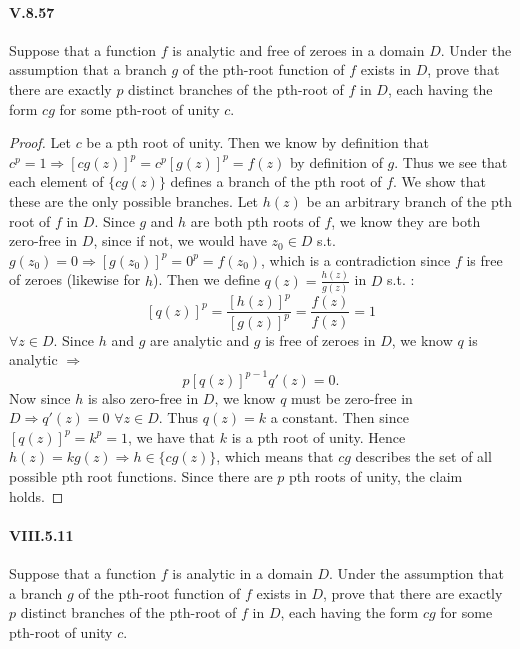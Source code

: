 \documentclass[10pt]{article}
\begin{document}
\paragraph{V.8.57} Suppose that a function $f$ is analytic and free of zeroes in a domain $D$. Under the assumption that a branch $g$ of the pth-root function of $f$ exists in $D$, prove that there are exactly $p$ distinct branches of the pth-root of $f$ in $D$, each having the form $cg$ for some pth-root of unity $c$.  
\begin{proof}
Let $c$ be a pth root of unity. Then we know by definition that $c^p = 1 \Rightarrow [cg(z)]^p = c^p [g(z)]^p = f(z)$ by definition of $g$. Thus we see that each element of $\{cg(z)\}$ defines a branch of the pth root of $f$. We show that these are the only possible branches. Let $h(z)$ be an arbitrary branch of the pth root of $f$ in $D$. Since $g$ and $h$ are both pth roots of $f$, we know they are both zero-free in $D$, since if not, we would have $z_0 \in D$ s.t. $g(z_0) = 0 \Rightarrow [g(z_0)]^p = 0^p = f(z_0)$, which is a contradiction since $f$ is free of zeroes (likewise for $h$). Then we define $q(z) = \frac{h(z)}{g(z)}$ in $D$ s.t. : 
\[[q(z)]^p = \frac{[h(z)]^p}{[g(z)]^p} = \frac{f(z)}{f(z)} = 1 \]
$\forall z \in D$. Since $h$ and $g$ are analytic and $g$ is free of zeroes in $D$, we know $q$ is analytic $\Rightarrow$
\[p[q(z)]^{p-1}q'(z) = 0.\]
Now since $h$ is also zero-free in $D$, we know $q$ must be zero-free in $D \Rightarrow q'(z) = 0$ $\forall z \in D$. Thus $q(z) = k$ a constant. Then since $[q(z)]^p = k^p = 1$, we have that $k$ is a pth root of unity. Hence $h(z) = kg(z) \Rightarrow h \in \{cg(z)\}$, which means that $cg$ describes the set of all possible pth root functions. Since there are $p$ pth roots of unity, the claim holds. 
\end{proof}

\paragraph{VIII.5.11} Suppose that a function $f$ is analytic in a domain $D$. Under the assumption that a branch $g$ of the pth-root function of $f$ exists in $D$, prove that there are exactly $p$ distinct branches of the pth-root of $f$ in $D$, each having the form $cg$ for some pth-root of unity $c$.  
\end{document}
